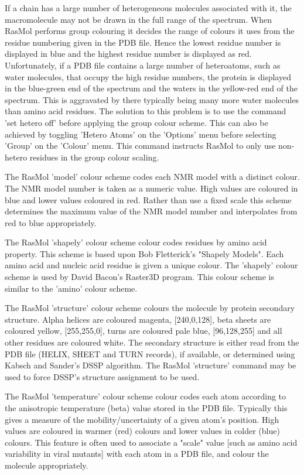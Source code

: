 If a chain has a large number of heterogeneous molecules associated with it,
the macromolecule may not be drawn in the full range of the spectrum. When
RasMol performs group colouring it decides the range of colours it uses from
the residue numbering given in the PDB file. Hence the lowest residue
number is displayed in blue and the highest residue number is displayed as
red. Unfortunately, if a PDB file contains a large number of heteroatoms,
such as water molecules, that occupy the high residue numbers, the protein
is displayed in the blue-green end of the spectrum and the waters in the
yellow-red end of the spectrum. This is aggravated by there typically being
many more water molecules than amino acid residues. The solution to this
problem is to use the command
'set hetero off'
before applying the group
colour scheme. This can also be achieved by toggling
'Hetero Atoms'
on the
'Options'
menu before selecting
'Group'
on the
'Colour'
menu. This command
instructs RasMol to only use non-hetero residues in the group colour scaling.

The RasMol
'model'
colour scheme codes each NMR model with a distinct
colour.  The NMR model number is taken as a numeric value.  High values
are coloured in blue and lower values coloured in red. Rather than use a
fixed scale this scheme determines the maximum value of the
NMR model number and interpolates from red to blue appropriately.

The RasMol
'shapely'
colour scheme colour codes residues by amino acid property. This scheme
is based upon Bob Fletterick's "Shapely Models". Each amino acid and
nucleic acid residue is given a unique colour. The
'shapely'
colour scheme is used by David Bacon's Raster3D program. This colour
scheme is similar to the
'amino'
colour scheme.

The RasMol
'structure'
colour scheme colours the molecule by protein secondary structure.
Alpha helices are coloured magenta, [240,0,128], beta sheets are
coloured yellow, [255,255,0], turns are coloured pale blue, [96,128,255]
and all other residues are coloured white. The secondary structure
is either read from the PDB file (HELIX, SHEET and TURN records), if available,
or determined using Kabsch and Sander's DSSP algorithm. The RasMol
'structure'
command may be used to force DSSP's structure assignment to be used.

The RasMol
'temperature'
colour scheme colour codes each atom according to the anisotropic
temperature (beta) value stored in the PDB file. Typically this gives
a measure of the mobility/uncertainty of a given atom's position. High
values are coloured in warmer (red) colours and lower values in colder
(blue) colours. This feature is often used to associate a "scale" value
[such as amino acid variability in viral mutants] with each atom in a
PDB file, and colour the molecule appropriately.

